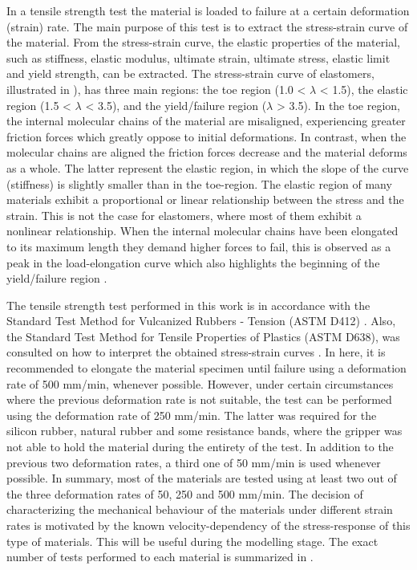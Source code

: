 In a tensile strength test the material is loaded to failure at a certain deformation (strain) rate. The main purpose of this test is to extract the stress-strain curve of the material. From the stress-strain curve, the elastic properties of the material, such as stiffness, elastic modulus, ultimate strain, ultimate stress, elastic limit and yield strength, can be extracted. The stress-strain curve of elastomers, illustrated in  ), has three main regions: the toe region (1.0 < $\lambda$ < 1.5), the elastic region (1.5 < $\lambda$ < 3.5), and the yield/failure region ($\lambda$ > 3.5). In the toe region, the internal molecular chains of the material are misaligned, experiencing greater friction forces which greatly oppose to initial deformations. In contrast, when the molecular chains are aligned the friction forces decrease and the material deforms as a whole. The latter represent the elastic region, in which the slope of the curve (stiffness) is slightly smaller than in the toe-region. The elastic region of many materials exhibit a proportional or linear relationship between the stress and the strain. This is not the case for elastomers, where most of them exhibit a nonlinear relationship. When the internal molecular chains have been elongated to its maximum length they demand higher forces to fail, this is observed as a peak in the load-elongation curve which also highlights the beginning of the yield/failure region \cite{Bauman2008}.

The tensile strength test performed in this work is in accordance with the Standard Test Method for Vulcanized Rubbers - Tension (ASTM D412) \cite{astmd412}. Also, the Standard Test Method for Tensile Properties of Plastics (ASTM D638), was consulted on how to interpret the obtained stress-strain curves \cite{astmd638}. In here, it is recommended to elongate the material specimen until failure using a deformation rate of 500 mm/min, whenever possible. However, under certain circumstances where the previous deformation rate is not suitable, the test can be performed using the deformation rate of 250 mm/min. The latter was required for the silicon rubber, natural rubber and some resistance bands, where the gripper was not able to hold the material during the entirety of the test. In addition to the previous two deformation rates, a third one of 50 mm/min is used whenever possible. In summary, most of the materials are tested using at least two out of the three deformation rates of 50, 250 and 500 mm/min. The decision of characterizing the mechanical behaviour of the materials under different strain rates is motivated by the known velocity-dependency of the stress-response of this type of materials. This will be useful during the modelling stage. The exact number of tests performed to each material is summarized in .

